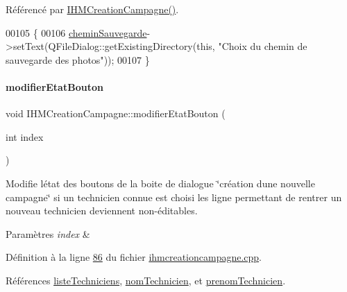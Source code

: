 Référencé par \hyperlink{ihmcreationcampagne_8cpp_source_l00011}{I\+H\+M\+Creation\+Campagne()}.


\begin{DoxyCode}
00105 \{
00106     \hyperlink{class_i_h_m_creation_campagne_a95c12e2d42063f9c510704b87e3357da}{cheminSauvegarde}->setText(QFileDialog::getExistingDirectory(\textcolor{keyword}{this}, \textcolor{stringliteral}{"Choix du chemin de
       sauvegarde des photos"}));
00107 \}
\end{DoxyCode}
\mbox{\label{class_i_h_m_creation_campagne_a93395fef027960e7ab0d5c75a76e7414}} 
\paragraph{\texorpdfstring{modifier\+Etat\+Bouton}{modifierEtatBouton}}
{\footnotesize\ttfamily void I\+H\+M\+Creation\+Campagne\+::modifier\+Etat\+Bouton (\begin{DoxyParamCaption}\item[{int}]{index }\end{DoxyParamCaption})\hspace{0.3cm}{\ttfamily [slot]}}



Modifie l\textquotesingle{}état des boutons de la boite de dialogue \char`\"{}création d\textquotesingle{}une nouvelle campagne\char`\"{} si un technicien connue est choisi les ligne permettant de rentrer un nouveau technicien deviennent non-\/éditables. 


\begin{DoxyParams}{Paramètres}
{\em index} & \\
\hline
\end{DoxyParams}


Définition à la ligne \hyperlink{ihmcreationcampagne_8cpp_source_l00086}{86} du fichier \hyperlink{ihmcreationcampagne_8cpp_source}{ihmcreationcampagne.\+cpp}.



Références \hyperlink{ihmcreationcampagne_8h_source_l00036}{liste\+Techniciens}, \hyperlink{ihmcreationcampagne_8h_source_l00028}{nom\+Technicien}, et \hyperlink{ihmcreationcampagne_8h_source_l00029}{prenom\+Technicien}.



